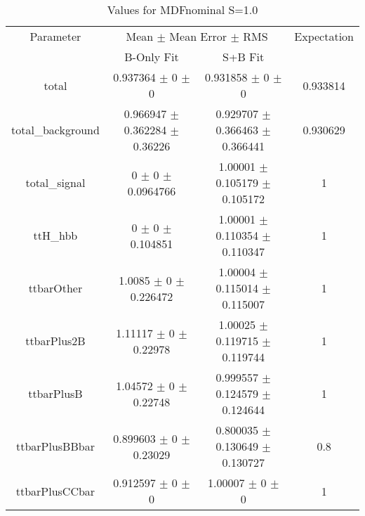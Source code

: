 \begin{table}
\centering
\caption{Values for MDFnominal S=1.0}
\begin{tabular}{cccc}
\toprule
Parameter & \multicolumn{2}{c}{Mean $\pm$ Mean Error $\pm$ RMS} & Expectation\\
 & B-Only Fit & S+B Fit & \\
\midrule
total & \num{0.937364} $\pm$ \num{0} $\pm$ \num{0} & \num{0.931858} $\pm$ \num{0} $\pm$ \num{0} & \num{0.933814}\\
total\_background & \num{0.966947} $\pm$ \num{0.362284} $\pm$ \num{0.36226} & \num{0.929707} $\pm$ \num{0.366463} $\pm$ \num{0.366441} & \num{0.930629}\\
total\_signal & \num{0} $\pm$ \num{0} $\pm$ \num{0.0964766} & \num{1.00001} $\pm$ \num{0.105179} $\pm$ \num{0.105172} & \num{1}\\
ttH\_hbb & \num{0} $\pm$ \num{0} $\pm$ \num{0.104851} & \num{1.00001} $\pm$ \num{0.110354} $\pm$ \num{0.110347} & \num{1}\\
ttbarOther & \num{1.0085} $\pm$ \num{0} $\pm$ \num{0.226472} & \num{1.00004} $\pm$ \num{0.115014} $\pm$ \num{0.115007} & \num{1}\\
ttbarPlus2B & \num{1.11117} $\pm$ \num{0} $\pm$ \num{0.22978} & \num{1.00025} $\pm$ \num{0.119715} $\pm$ \num{0.119744} & \num{1}\\
ttbarPlusB & \num{1.04572} $\pm$ \num{0} $\pm$ \num{0.22748} & \num{0.999557} $\pm$ \num{0.124579} $\pm$ \num{0.124644} & \num{1}\\
ttbarPlusBBbar & \num{0.899603} $\pm$ \num{0} $\pm$ \num{0.23029} & \num{0.800035} $\pm$ \num{0.130649} $\pm$ \num{0.130727} & \num{0.8}\\
ttbarPlusCCbar & \num{0.912597} $\pm$ \num{0} $\pm$ \num{0} & \num{1.00007} $\pm$ \num{0} $\pm$ \num{0} & \num{1}\\
\bottomrule
\end{tabular}
\end{table}